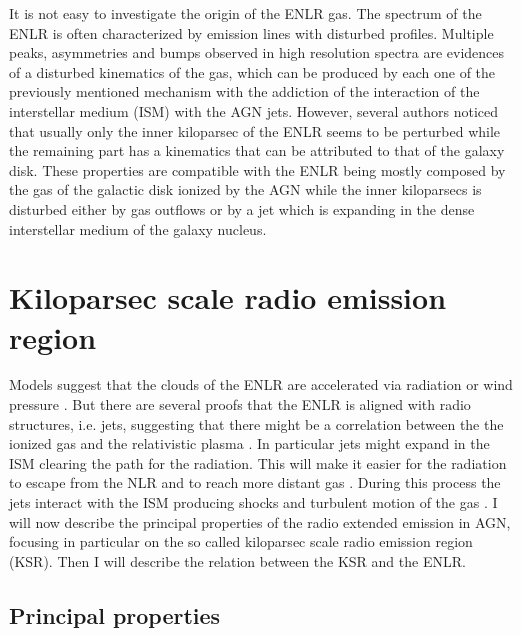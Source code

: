 \documentclass[../thesis.tex]{subfiles}
\begin{document}
It is not easy to investigate the origin of the ENLR gas.
The spectrum of the ENLR is often characterized by emission lines with disturbed profiles.
Multiple peaks, asymmetries and bumps observed in high resolution spectra \citep{Ozaki09,Morganti07,Congiu17} are evidences of a disturbed kinematics of the gas, which can be produced by each one of the previously mentioned mechanism with the addiction of the interaction of the interstellar medium (ISM) with the AGN jets.
However, several authors \citep[e.g.][]{Unger87,Fischer17,Fischer18} noticed that usually only the inner kiloparsec of the ENLR seems to be perturbed while the remaining part has a kinematics that can be attributed to that of the galaxy disk.
These properties are compatible with the ENLR being mostly composed by the gas of the galactic disk ionized by the AGN while the inner kiloparsecs is disturbed either by gas outflows or by a jet which is expanding in the dense interstellar medium of the galaxy nucleus.



\section{Kiloparsec scale radio emission region}
\label{sec:ksr}

Models suggest that the clouds of the ENLR are accelerated via radiation or wind pressure \citep{Crenshaw00,Crenshaw00b}.
But there are several proofs that the ENLR is aligned with radio structures, i.e. jets, suggesting that there might be a correlation between the the ionized gas and the relativistic plasma \citep[e.g.][]{Unger87,Wilson94,Falcke98,Schmitt03,Schmitt03b,Morganti07,Husemann13}.
In particular jets might expand in the ISM clearing the path for the radiation.
This will make it easier for the radiation to escape from the NLR and to reach more distant gas \citep{Wilson94}.
During this process the jets interact with the ISM producing shocks and turbulent motion of the gas \citep[e.g.][]{Cracco11,Contini13,Congiu17}.
I will now describe the principal properties of the radio extended emission in AGN, focusing in particular on the so called kiloparsec scale radio emission region (KSR).
Then I will describe the relation between the KSR and the ENLR.

\subsection{Principal properties}
\label{sec:princ_prop}
\end{document}
